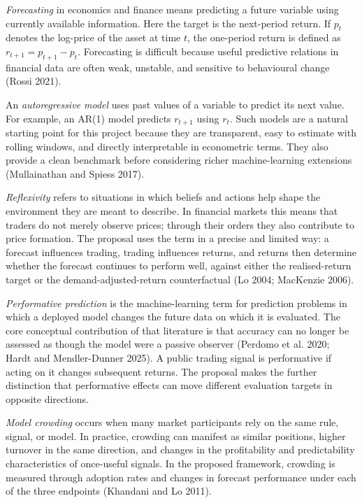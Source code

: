 \documentclass[11pt]{article}
\begin{document}
\emph{Forecasting} in economics and finance means predicting a future variable using currently available information. Here the target is the next-period return. If $p_t$ denotes the log-price of the asset at time $t$, the one-period return is defined as $r_{t+1} = p_{t+1} - p_t$. Forecasting is difficult because useful predictive relations in financial data are often weak, unstable, and sensitive to behavioural change (Rossi 2021).

An \emph{autoregressive model} uses past values of a variable to predict its next value. For example, an AR(1) model predicts $r_{t+1}$ using $r_t$. Such models are a natural starting point for this project because they are transparent, easy to estimate with rolling windows, and directly interpretable in econometric terms. They also provide a clean benchmark before considering richer machine-learning extensions (Mullainathan and Spiess 2017).

\emph{Reflexivity} refers to situations in which beliefs and actions help shape the environment they are meant to describe. In financial markets this means that traders do not merely observe prices; through their orders they also contribute to price formation. The proposal uses the term in a precise and limited way: a forecast influences trading, trading influences returns, and returns then determine whether the forecast continues to perform well, against either the realised-return target or the demand-adjusted-return counterfactual (Lo 2004; MacKenzie 2006).

\emph{Performative prediction} is the machine-learning term for prediction problems in which a deployed model changes the future data on which it is evaluated. The core conceptual contribution of that literature is that accuracy can no longer be assessed as though the model were a passive observer (Perdomo et al. 2020; Hardt and Mendler-Dunner 2025). A public trading signal is performative if acting on it changes subsequent returns. The proposal makes the further distinction that performative effects can move different evaluation targets in opposite directions.

\emph{Model crowding} occurs when many market participants rely on the same rule, signal, or model. In practice, crowding can manifest as similar positions, higher turnover in the same direction, and changes in the profitability and predictability characteristics of once-useful signals. In the proposed framework, crowding is measured through adoption rates and changes in forecast performance under each of the three endpoints (Khandani and Lo 2011).
\end{document}
